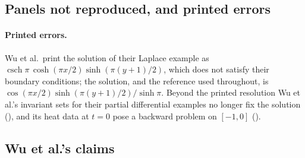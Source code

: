 \subsection{Panels not reproduced, and printed errors}
\label{app:repro-unreproduced}

\paragraph{Printed errors.} Wu et al.\ print the solution of their Laplace example as $\operatorname{csch}\pi\,\cosh(\pi x/2)\sinh(\pi(y+1)/2)$, which does not satisfy their boundary conditions; the solution, and the reference used throughout, is $\cos(\pi x/2)\sinh(\pi(y+1)/2)/\sinh\pi$. Beyond the printed resolution Wu et al.'s invariant sets for their partial differential examples no longer fix the solution (), and its heat data at $t=0$ pose a backward problem on $[-1,0]$ ().

\subsection{Wu et al.'s claims}
\label{app:paper-claims}

